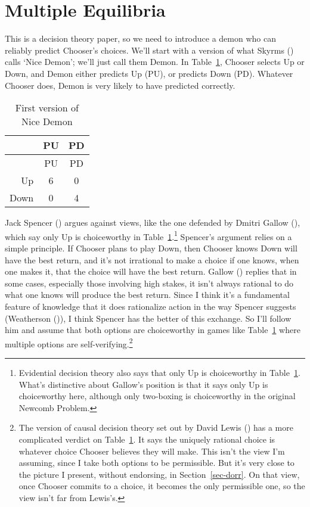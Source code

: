 \documentclass[
  11pt,
  letterpaper,
  DIV=11,
  numbers=noendperiod,
  twoside]{scrartcl}
\begin{document}
\section{Multiple Equilibria}\label{sec-multieq}

This is a decision theory paper, so we need to introduce a demon who can
reliably predict Chooser's choices. We'll start with a version of what
Skyrms () calls `Nice Demon'; we'll just
call them Demon. In Table~\ref{tbl-nice-demon}, Chooser selects Up or
Down, and Demon either predicts Up (PU), or predicts Down (PD). Whatever
Chooser does, Demon is very likely to have predicted correctly.

\begin{longtable}[]{@{}rcc@{}}
\caption{First version of Nice
Demon}\label{tbl-nice-demon}\tabularnewline
\toprule\noalign{}
& PU & PD \\
\midrule\noalign{}
\endfirsthead
\toprule\noalign{}
& PU & PD \\
\midrule\noalign{}
\endhead
\bottomrule\noalign{}
\endlastfoot
Up & 6 & 0 \\
Down & 0 & 4 \\
\end{longtable}

Jack Spencer () argues against views,
like the one defended by Dmitri Gallow
(), which say only Up is choiceworthy in
Table~\ref{tbl-nice-demon}.\footnote{Evidential decision theory also
  says that only Up is choiceworthy in Table~\ref{tbl-nice-demon}.
  What's distinctive about Gallow's position is that it says only Up is
  choiceworthy here, although only two-boxing is choiceworthy in the
  original Newcomb Problem.} Spencer's argument relies on a simple
principle. If Chooser plans to play Down, then Chooser knows Down will
have the best return, and it's not irrational to make a choice if one
knows, when one makes it, that the choice will have the best return.
Gallow () replies that in some cases,
especially those involving high stakes, it isn't always rational to do
what one knows will produce the best return. Since I think it's a
fundamental feature of knowledge that it does rationalize action in the
way Spencer suggests (Weatherson
()), I think Spencer has the better
of this exchange. So I'll follow him and assume that both options are
choiceworthy in games like Table~\ref{tbl-nice-demon} where multiple
options are self-verifying.\footnote{The version of causal decision
  theory set out by David Lewis () has a
  more complicated verdict on Table~\ref{tbl-nice-demon}. It says the
  uniquely rational choice is whatever choice Chooser believes they will
  make. This isn't the view I'm assuming, since I take both options to
  be permissible. But it's very close to the picture I present, without
  endorsing, in Section~\ref{sec-dorr}. On that view, once Chooser
  commits to a choice, it becomes the only permissible one, so the view
  isn't far from Lewis's.}
\end{document}
